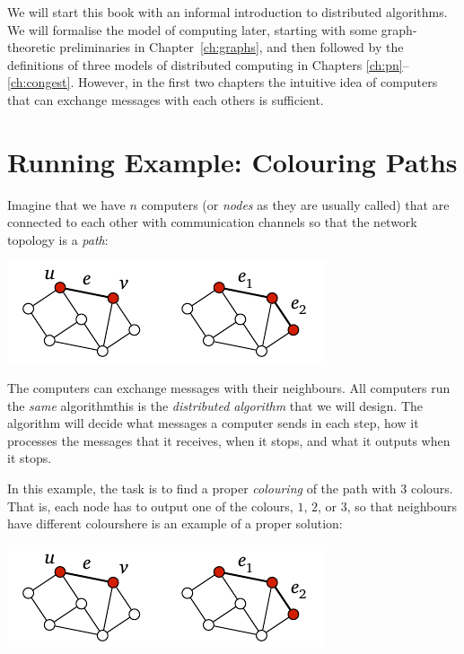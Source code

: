 
We will start this book with an informal introduction to distributed algorithms. We will formalise the model of computing later, starting with some graph-theoretic preliminaries in Chapter~\ref{ch:graphs}, and then followed by the definitions of three models of distributed computing in Chapters \ref{ch:pn}--\ref{ch:congest}. However, in the first two chapters the intuitive idea of computers that can exchange messages with each others is sufficient.

\section{Running Example: Colouring Paths}

Imagine that we have $n$ computers (or \emph{nodes} as they are usually called) that are connected to each other with communication channels so that the network topology is a \emph{path}:
\begin{center}
    \includegraphics[page=\PIntroTopo]{figs.pdf}
\end{center}
The computers can exchange messages with their neighbours. All computers run the \emph{same} algorithm\mydash this is the \emph{distributed algorithm} that we will design. The algorithm will decide what messages a computer sends in each step, how it processes the messages that it receives, when it stops, and what it outputs when it stops.

In this example, the task is to find a proper \emph{colouring} of the path with $3$ colours. That is, each node has to output one of the colours, $1$, $2$, or $3$, so that neighbours have different colours\mydash here is an example of a proper solution:
\begin{center}
    \includegraphics[page=\PIntroCol]{figs.pdf}
\end{center}

